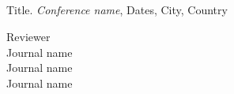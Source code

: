 \documentclass[margin,line,10pt]{res}
\begin{document}
\begin{resume}
\section{}
Title. \textit{Conference name}, Dates, City, Country\\

\vspace*{-.2in}

{\sc Reviewer}\\
\vspace*{-.35in}
Journal name\\
Journal name\\
Journal name\\

\end{resume}
\end{document}
